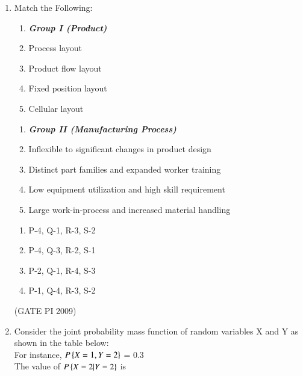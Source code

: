 \documentclass[journal,12pt,onecolumn]{IEEEtran}
\theoremstyle{remark}
\begin{document}
\begin{enumerate}
\item Match the Following:
{
\setlength{\columnsep}{-5cm}
\begin{multicols}{2}
\begin{enumerate}[label=\Alph*.]
    \item[]  \textit{\textbf{Group I (Product)}}
    \item Process layout
    \item Product flow layout
    \item Fixed position layout
    \item Cellular layout 
\end{enumerate}
\columnbreak
\begin{enumerate}[label=\arabic*.]
    \item[] \textit{\textbf{Group II (Manufacturing Process)}}
    \item Inflexible to significant changes in product design
    \item Distinct part families and expanded worker training
    \item Low equipment utilization and high skill requirement
    \item Large work-in-process and increased material handling
\end{enumerate}
\end{multicols}
}
\begin{multicols}{2}
\begin{enumerate}
    \item P-4, Q-1, R-3, S-2
    \item P-4, Q-3, R-2, S-1
    \item P-2, Q-1, R-4, S-3
    \item P-1, Q-4, R-3, S-2
\end{enumerate}
\end{multicols}
\hfill (GATE PI 2009)
\item Consider the joint probability mass function of random variables X and Y as shown in the table below: \\
For instance, $P\cbrak{X=1, Y=2}$ = 0.3
$$

$$
The value of $P\cbrak{X=2|Y=2}$ is

\begin{enumerate}
\end{enumerate}


\end{enumerate}
\end{document}
